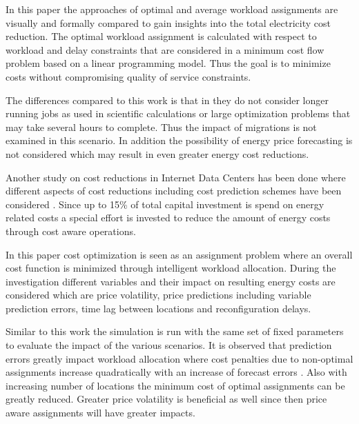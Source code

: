 In this paper the approaches of optimal and average workload assignments are visually and formally compared to gain insights into the total electricity cost reduction. The optimal workload assignment is calculated with respect to workload and delay constraints that are considered in a minimum cost flow problem based on a linear programming model. Thus the goal is to minimize costs without compromising quality of service constraints. 

The differences compared to this work is that in \cite{rao2010minimizing} they do not consider longer running jobs as used in scientific calculations or large optimization problems that may take several hours to complete. Thus the impact of migrations is not examined in this scenario. In addition the possibility of energy price forecasting is not considered which may result in even greater energy cost reductions. 

Another study on cost reductions in Internet Data Centers has been done where different aspects of cost reductions including cost prediction schemes have been considered \cite{de2013study}. Since up to 15\% of total capital investment is spend on energy related costs 
a special effort is invested to reduce the amount of energy costs through cost aware operations. %

In this paper cost optimization is seen as an assignment problem where an overall cost function is minimized through intelligent workload allocation. During the investigation different variables and their impact on resulting energy costs are considered which are price volatility, price predictions including variable prediction errors, time lag between locations and reconfiguration delays. 

Similar to this work the simulation is run with the same set of fixed parameters to evaluate the impact of the various scenarios. It is observed that prediction errors greatly impact workload allocation where cost penalties due to non-optimal assignments increase quadratically with an increase of forecast errors \cite{de2013study}. Also with increasing number of locations the minimum cost of optimal assignments can be greatly reduced. Greater price volatility is beneficial as well since then price aware assignments will have greater impacts. 

